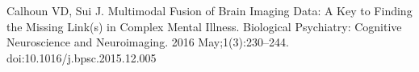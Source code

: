 \documentclass[10pt,letterpaper]{article}
\begin{document}
\begin{thebibliography}{10}
Calhoun VD, Sui J.
\newblock Multimodal Fusion of Brain Imaging Data: A Key to Finding the Missing
  Link(s) in Complex Mental Illness.
\newblock Biological Psychiatry: Cognitive Neuroscience and Neuroimaging. 2016
  May;1(3):230--244. doi:10.1016/j.bpsc.2015.12.005


  




\end{thebibliography}
\end{document}
